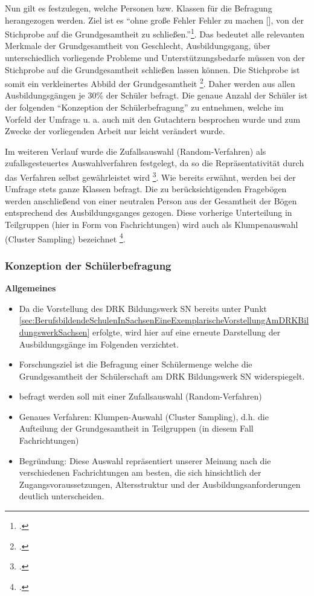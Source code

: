 Nun gilt es festzulegen, welche Personen bzw. Klassen für die Befragung herangezogen werden. Ziel ist es "`ohne große Fehler Fehler zu machen [\punkte], von der Stichprobe auf die Grundgesamtheit zu schließen."'\footcite[60]{Mayer2013}. Das bedeutet alle relevanten Merkmale der Grundgesamtheit von Geschlecht, Ausbildungsgang, über unterschiedlich vorliegende Probleme und Unterstützungsbedarfe müssen von der Stichprobe auf die Grundgesamtheit schließen lassen können. Die Stichprobe ist somit ein verkleinertes Abbild der Grundgesamtheit \footcite [vgl.][197]{Kromrey1995}. Daher werden aus allen Ausbildungsgängen je 30\% der Schüler befragt. Die genaue Anzahl der Schüler ist der folgenden "`Konzeption der Schülerbefragung"' zu entnehmen, welche im Vorfeld der Umfrage u. a. auch mit den Gutachtern besprochen wurde und zum Zwecke der vorliegenden Arbeit nur leicht verändert wurde.

Im weiteren Verlauf wurde die Zufallsauswahl (Random-Verfahren) als zufallsgesteuertes Auswahlverfahren festgelegt, da so die Repräsentativität durch das Verfahren selbst gewährleistet wird \footcite[vgl.][60]{Mayer2013}. Wie bereits erwähnt, werden bei der Umfrage stets ganze Klassen befragt. Die zu berücksichtigenden Fragebögen werden anschließend von einer neutralen Person aus der Gesamtheit der Bögen entsprechend des Ausbildungsganges gezogen. Diese vorherige Unterteilung in Teilgruppen (hier in Form von Fachrichtungen) wird auch als Klumpenauswahl (Cluster Sampling) bezeichnet \footcite[vgl.][63]{Mayer2013}.

\subsubsection{Konzeption der Schülerbefragung}
\label{sec:KonzeptionDerSchülerbefragung}

\textbf{Allgemeines}
\begin{itemize}
	\item Da die Vorstellung des DRK Bildungswerk SN bereits unter Punkt \ref{sec:BerufsbildendeSchulenInSachsenEineExemplarischeVorstellungAmDRKBildungswerkSachsen} erfolgte, wird hier auf eine erneute Darstellung der Ausbildungsgänge im Folgenden verzichtet.
	\item Forschungsziel ist die Befragung einer Schülermenge welche die Grundgesamtheit der Schülerschaft am DRK Bildungswerk SN widerspiegelt.
	\item befragt werden soll mit einer Zufallsauswahl (Random-Verfahren)
	\item Genaues Verfahren: Klumpen-Auswahl (Cluster Sampling), d.h. die Aufteilung der Grundgesamtheit in Teilgruppen (in diesem Fall Fachrichtungen) 
	\item Begründung: Diese Auswahl repräsentiert unserer Meinung nach die verschiedenen Fachrichtungen am besten, die sich hinsichtlich der Zugangsvoraussetzungen, Altersstruktur und der Ausbildungsanforderungen deutlich unterscheiden.
\end{itemize}

